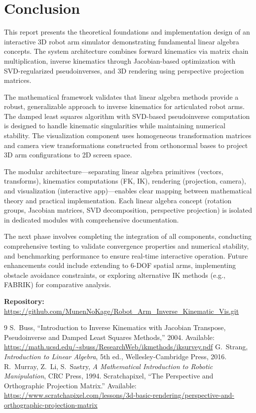 \documentclass[11pt]{article}
\begin{document}
\section{Conclusion}

This report presents the theoretical foundations and implementation design of an interactive 3D robot arm simulator demonstrating fundamental linear algebra concepts. The system architecture combines forward kinematics via matrix chain multiplication, inverse kinematics through Jacobian-based optimization with SVD-regularized pseudoinverses, and 3D rendering using perspective projection matrices.

The mathematical framework validates that linear algebra methods provide a robust, generalizable approach to inverse kinematics for articulated robot arms. The damped least squares algorithm with SVD-based pseudoinverse computation is designed to handle kinematic singularities while maintaining numerical stability. The visualization component uses homogeneous transformation matrices and camera view transformations constructed from orthonormal bases to project 3D arm configurations to 2D screen space.

The modular architecture---separating linear algebra primitives (vectors, transforms), kinematics computations (FK, IK), rendering (projection, camera), and visualization (interactive app)---enables clear mapping between mathematical theory and practical implementation. Each linear algebra concept (rotation groups, Jacobian matrices, SVD decomposition, perspective projection) is isolated in dedicated modules with comprehensive documentation.

The next phase involves completing the integration of all components, conducting comprehensive testing to validate convergence properties and numerical stability, and benchmarking performance to ensure real-time interactive operation. Future enhancements could include extending to 6-DOF spatial arms, implementing obstacle avoidance constraints, or exploring alternative IK methods (e.g., FABRIK) for comparative analysis.

\vspace{0.5em}
\noindent\textbf{Repository:} \url{https://github.com/MunenNoKage/Robot_Arm_Inverse_Kinematic_Vis.git}

\begin{thebibliography}{9}
 S.~Buss, ``Introduction to Inverse Kinematics with Jacobian Transpose, Pseudoinverse and Damped Least Squares Methods,'' 2004. Available: \url{https://math.ucsd.edu/~sbuss/ResearchWeb/ikmethods/iksurvey.pdf}
 G.~Strang, \textit{Introduction to Linear Algebra}, 5th ed., Wellesley-Cambridge Press, 2016.
 R.~Murray, Z.~Li, S.~Sastry, \textit{A Mathematical Introduction to Robotic Manipulation}, CRC Press, 1994.
 Scratchapixel, ``The Perspective and Orthographic Projection Matrix.'' Available: \url{https://www.scratchapixel.com/lessons/3d-basic-rendering/perspective-and-orthographic-projection-matrix}
\end{thebibliography}
\end{document}
